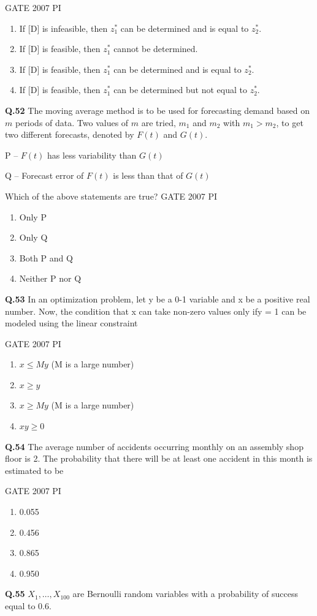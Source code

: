 \documentclass[journal,12pt,onecolumn]{exam}
\theoremstyle{remark}
\begin{document}
\hfill{GATE 2007 PI}

\begin{enumerate}
    \item If [D] is infeasible, then $z_1^*$ can be determined and is equal to $z_2^*$.
    \item If [D] is feasible, then $z_1^*$ cannot be determined.
    \item If [D] is feasible, then $z_1^*$ can be determined and is equal to $z_2^*$.
    \item If [D] is feasible, then $z_1^*$ can be determined but not equal to $z_2^*$.
\end{enumerate}
\noindent
\textbf{Q.52}
The moving average method is to be used for forecasting demand based on $m$ periods of data. 
Two values of $m$ are tried, $m_1$ and $m_2$ with $m_1 > m_2$, to get two different forecasts, 
denoted by $F(t)$ and $G(t)$.  

P -- $F(t)$ has less variability than $G(t)$  

Q -- Forecast error of $F(t)$ is less than that of $G(t)$  

Which of the above statements are true?
\hfill{GATE 2007 PI}
\begin{enumerate}
    \item Only P
    \item Only Q
    \item Both P and Q
    \item Neither P nor Q     
    \end{enumerate}
    \noindent
    \textbf{Q.53}
In an optimization problem, let y be a 0-1 variable and x be a positive real number. Now, the condition that x can take non-zero values only ify = 1 can be modeled using the linear constraint

\hfill{GATE 2007 PI}


\begin{enumerate}
    \item $x \leq My$ \quad (M is a large number)
    \item $x \geq y$
    \item $x \geq My$ \quad (M is a large number)
    \item $xy \geq 0$
\end{enumerate}
\noindent
\textbf{Q.54}
The average number of accidents occurring monthly on an assembly shop floor is 2.
The probability that there will be at least one accident in this month is estimated to be

\hfill{GATE 2007 PI}
\begin{enumerate}
    \item 0.055
    \item 0.456
    \item 0.865
    \item 0.950
\end{enumerate}
\noindent
\textbf{Q.55}
$X_1, \ldots, X_{100}$ are Bernoulli random variables with a probability of success equal to $0.6$.  
\end{document}
